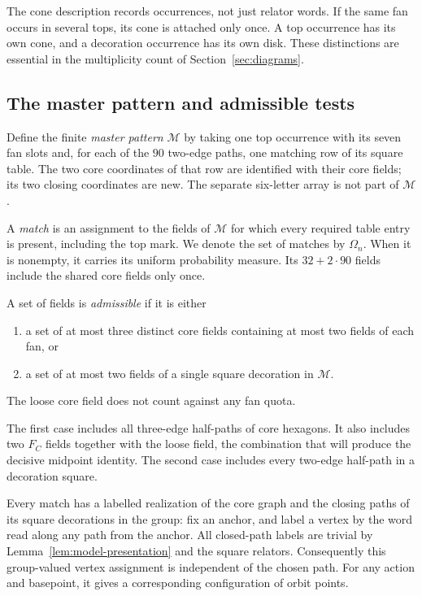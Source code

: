 \begin{remark}\label{rem:model-finite}
The cone description records occurrences, not just relator words. If the same fan occurs in several tops, its cone is attached only once. A top occurrence has its own cone, and a decoration occurrence has its own disk. These distinctions are essential in the multiplicity count of Section~\ref{sec:diagrams}.
\end{remark}

\subsection{The master pattern and admissible tests}
Define the finite \emph{master pattern} $\mathcal M$ by taking one top occurrence with its seven fan slots and, for each of the $90$ two-edge paths, one matching row of its square table. The two core coordinates of that row are identified with their core fields; its two closing coordinates are new. The separate six-letter array is not part of $\mathcal M$.

A \emph{match} is an assignment to the fields of $\mathcal M$ for which every required table entry is present, including the top mark. We denote the set of matches by $\Omega_n$. When it is nonempty, it carries its uniform probability measure. Its $32+2\cdot90$ fields include the shared core fields only once.

\begin{definition}\label{def:admissible}
A set of fields is \emph{admissible} if it is either
\begin{enumerate}[label=\textup{(\roman*)}]
\item a set of at most three distinct core fields containing at most two fields of each fan, or
\item a set of at most two fields of a single square decoration in $\mathcal M$.
\end{enumerate}
The loose core field does not count against any fan quota.
\end{definition}

The first case includes all three-edge half-paths of core hexagons. It also includes two $F_C$ fields together with the loose field, the combination that will produce the decisive midpoint identity. The second case includes every two-edge half-path in a decoration square.

Every match has a labelled realization of the core graph and the closing paths of its square decorations in the group: fix an anchor, and label a vertex by the word read along any path from the anchor. All closed-path labels are trivial by Lemma~\ref{lem:model-presentation} and the square relators. Consequently this group-valued vertex assignment is independent of the chosen path. For any action and basepoint, it gives a corresponding configuration of orbit points.
